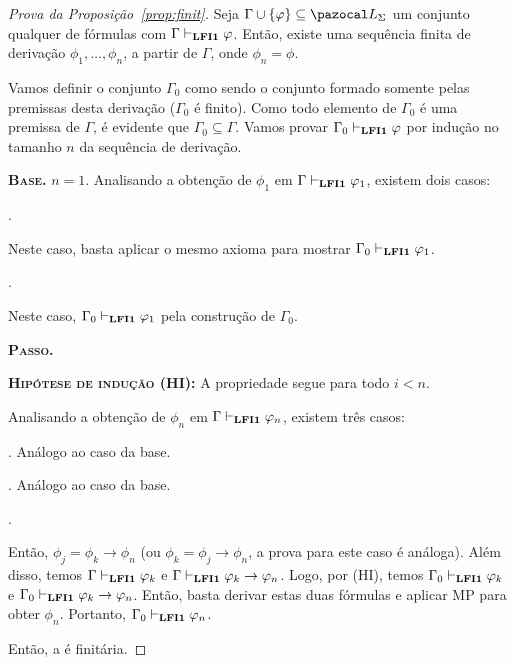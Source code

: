     \begin{proof}[Prova da Proposição~\ref{prop:finit}]
        Seja $\Gamma \cup \{\phi\} \subseteq \ling{}$ um conjunto qualquer de fórmulas com $\Gamma \vdash_{{\normalfont\textbf{LFI1}}{}} \varphi$. Então, existe uma sequência finita de derivação $\phi_1, \ldots, \phi_n$, a partir de $\Gamma$, onde $\phi_n = \phi$. 
        
        Vamos definir o conjunto $\Gamma_0$ como sendo o conjunto formado somente pelas premissas desta derivação ($\Gamma_0$ é finito). Como todo elemento de $\Gamma_0$ é uma premissa de $\Gamma$, é evidente que $\Gamma_0 \subseteq \Gamma$. Vamos provar $\Gamma_0 \vdash_{{\normalfont\textbf{LFI1}}{}} \varphi$ por indução no tamanho $n$ da sequência de derivação.


        \begin{adjustwidth}{1cm}{}

            \textbf{\textsc{Base.}} $n = 1$.
            Analisando a obtenção de $\phi_1$ em $\Gamma \vdash_{{\normalfont\textbf{LFI1}}{}} \varphi_1$, existem dois casos:
            \begin{provaporcasos}
                . 
                
                    Neste caso, basta aplicar o mesmo axioma para mostrar $\Gamma_0 \vdash_{{\normalfont\textbf{LFI1}}{}} \varphi_1$.
    
                \casodeprova{$\phi_1 \in \Gamma$}. 
                
                    Neste caso, $\Gamma_0 \vdash_{{\normalfont\textbf{LFI1}}{}} \varphi_1$ pela construção de $\Gamma_0$.
            \end{provaporcasos}

            \noindent\textbf{\textsc{Passo.}} 
            
            \noindent \textbf{\textsc{Hipótese de indução (HI):}} A propriedade segue para todo $i < n$.

            Analisando a obtenção de $\phi_n$ em $\Gamma \vdash_{{\normalfont\textbf{LFI1}}{}} \varphi_n$, existem três casos:
            \begin{provaporcasos}
                . Análogo ao caso da base.
    
                . Análogo ao caso da base.

                .
                
                Então, $\phi_j = \phi_k \to \phi_n$ (ou $\phi_k = \phi_j \to \phi_n$, a prova para este caso é análoga). Além disso, temos $\Gamma \vdash_{{\normalfont\textbf{LFI1}}{}} \varphi_k$ e $\Gamma \vdash_{{\normalfont\textbf{LFI1}}{}} \varphi_k \to \varphi_n$. Logo, por (HI), temos $\Gamma_0 \vdash_{{\normalfont\textbf{LFI1}}{}} \varphi_k$ e $\Gamma_0 \vdash_{{\normalfont\textbf{LFI1}}{}} \varphi_k \to \varphi_n$. Então, basta derivar estas duas fórmulas e aplicar MP para obter $\phi_n$. Portanto, $\Gamma_0 \vdash_{{\normalfont\textbf{LFI1}}{}} \varphi_n$.
            \end{provaporcasos}
        \end{adjustwidth}
        Então, a \lfium{} é finitária.

    \end{proof}



